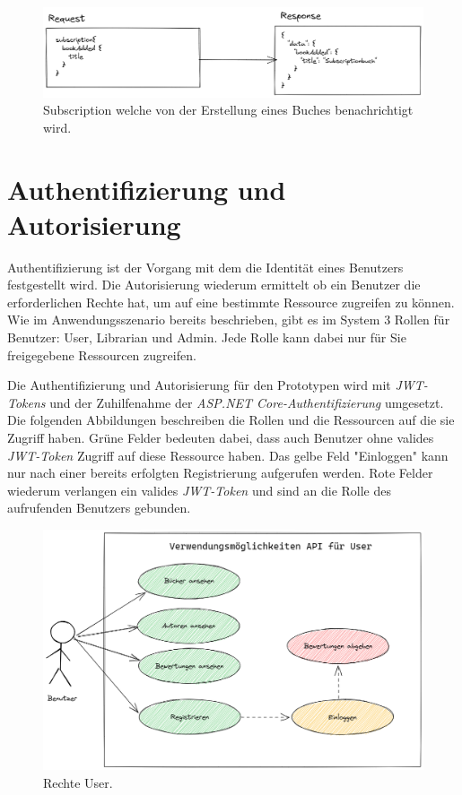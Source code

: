 \begin{figure}[H]
    \includegraphics[width=\textwidth]{pics/bookSubscription.png}
    \caption{Subscription welche von der Erstellung eines Buches benachrichtigt wird.}
\end{figure}

\section{Authentifizierung und Autorisierung}
Authentifizierung ist der Vorgang mit dem die Identität eines Benutzers festgestellt wird.
Die Autorisierung wiederum ermittelt ob ein Benutzer die erforderlichen Rechte hat, um auf eine bestimmte Ressource zugreifen zu können.
Wie im Anwendungsszenario bereits beschrieben, gibt es im System 3 Rollen für Benutzer: User, Librarian und Admin.
Jede Rolle kann dabei nur für Sie freigegebene Ressourcen zugreifen.
\newline

Die Authentifizierung und Autorisierung für den Prototypen wird mit \textit{JWT-Tokens} und der Zuhilfenahme der \textit{ASP.NET Core-Authentifizierung} umgesetzt.
Die folgenden Abbildungen beschreiben die Rollen und die Ressourcen auf die sie Zugriff haben.
Grüne Felder bedeuten dabei, dass auch Benutzer ohne valides \textit{JWT-Token} Zugriff auf diese Ressource haben.
Das gelbe Feld "Einloggen" kann nur nach einer bereits erfolgten Registrierung aufgerufen werden.
Rote Felder wiederum verlangen ein valides \textit{JWT-Token} und sind an die Rolle des aufrufenden Benutzers gebunden.

\begin{figure}[H]
    \includegraphics[width=\textwidth]{pics/UseCaseUser.png}
    \caption{Rechte User.}
\end{figure}

